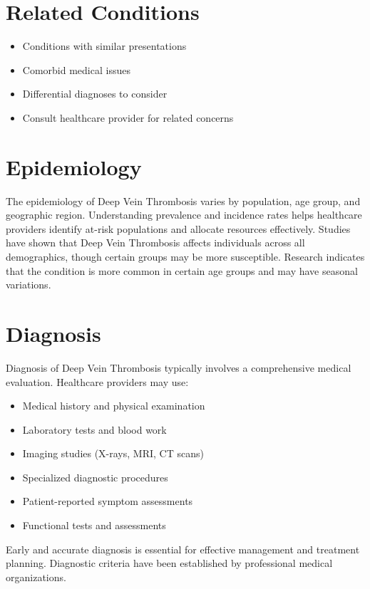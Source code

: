 \section*{Related Conditions}
\begin{itemize}
  \item Conditions with similar presentations
  \item Comorbid medical issues
  \item Differential diagnoses to consider
  \item Consult healthcare provider for related concerns
\end{itemize}

\section*{Epidemiology}
The epidemiology of Deep Vein Thrombosis varies by population, age group, and geographic region. Understanding prevalence and incidence rates helps healthcare providers identify at-risk populations and allocate resources effectively. Studies have shown that Deep Vein Thrombosis affects individuals across all demographics, though certain groups may be more susceptible. Research indicates that the condition is more common in certain age groups and may have seasonal variations.

\section*{Diagnosis}
Diagnosis of Deep Vein Thrombosis typically involves a comprehensive medical evaluation. Healthcare providers may use:
\begin{itemize}
  \item Medical history and physical examination
  \item Laboratory tests and blood work
  \item Imaging studies (X-rays, MRI, CT scans)
  \item Specialized diagnostic procedures
  \item Patient-reported symptom assessments
  \item Functional tests and assessments
\end{itemize}
Early and accurate diagnosis is essential for effective management and treatment planning. Diagnostic criteria have been established by professional medical organizations.

